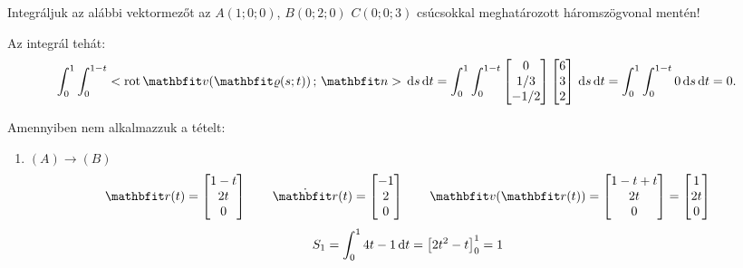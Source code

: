 \documentclass[exercise]{math-standalone}
\begin{document}
\begin{exercise}{%
    Integráljuk az alábbi vektormezőt az $A(1;0;0)$, $B(0;2;0)$ $C(0;0;3)$
    csúcsokkal meghatározott háromszögvonal mentén!
  }
{    Az integrál tehát:
    \[
      \int_0^1 \int_0^{1 - t}
      \scalar{\rot \rvec v (\surfv(s;t))}{\rvec n}
      \, \diff s \, \diff t
      =
      \int_0^1 \int_0^{1 - t}
      \begin{bmatrix}
        0 \\ 1/3 \\ -1/2
      \end{bmatrix}
      \begin{bmatrix}
        6 \\ 3 \\ 2
      \end{bmatrix}
      \, \diff s \, \diff t
      =
      \int_0^1 \int_0^{1 - t}
      0
      \, \diff s \, \diff t
      =
      0
      \text.
    \]

    Amennyiben nem alkalmazzuk a tételt:
    \begin{enumerate}
      \item $(A) \rightarrow (B)$
            \[
              \arcv(t) = \begin{bmatrix}
                1 - t \\ 2t \\ 0
              \end{bmatrix}
              \qquad
              \dot{\arcv}(t) = \begin{bmatrix}
                -1 \\ 2 \\ 0
              \end{bmatrix}
              \qquad
              \rvec v(\rvec r(t)) = \begin{bmatrix}
                1 - t + t \\ 2t \\ 0
              \end{bmatrix} = \begin{bmatrix}
                1 \\ 2t \\ 0
              \end{bmatrix}
            \]
            \[
              S_1 = \int_0^1 4t - 1 \, \mathrm{d} t = \left[ 2t^2 - t \right]_0^1 = 1
            \]


\end{enumerate}}
\end{exercise}
\end{document}
